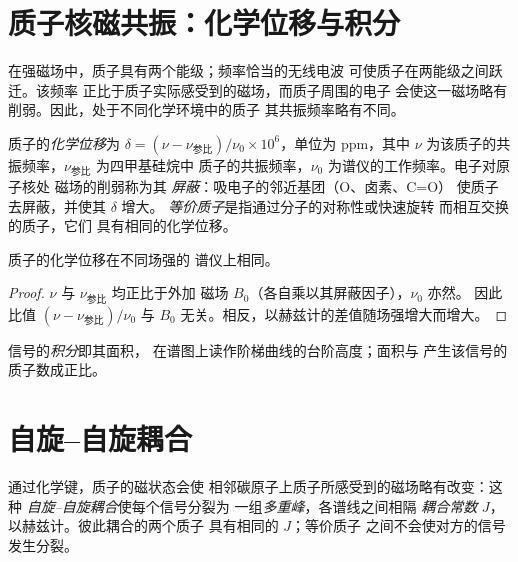 \section{质子核磁共振：化学位移与积分}

在强磁场中，质子具有两个能级；频率恰当的无线电波
可使质子在两能级之间跃迁。该频率
正比于质子实际感受到的磁场，而质子周围的电子
会使这一磁场略有削弱。因此，处于不同化学环境中的质子
其共振频率略有不同。

\begin{definition}\label{def:b1:structure-spectroscopy:chemical-shift}
质子的\emph{化学位移}为
$\delta = (\nu - \nu_{\text{参比}})/\nu_0 \times 10^6$，单位为 \unit{ppm}，其中
$\nu$ 为该质子的共振频率，$\nu_{\text{参比}}$ 为四甲基硅烷中
质子的共振频率，$\nu_0$ 为谱仪的工作频率。电子对原子核处
磁场的削弱称为其
\emph{屏蔽}：吸电子的邻近基团（O、卤素、C=O）
使质子去屏蔽，并使其 $\delta$ 增大。
\emph{等价质子}是指通过分子的对称性或快速旋转
而相互交换的质子，它们
具有相同的化学位移。
\end{definition}

\begin{proposition}[化学位移与谱仪无关]\label{prop:b1:structure-spectroscopy:shift-field-independent}
质子的化学位移在不同场强的
谱仪上相同。
\end{proposition}

\begin{proof}
$\nu$ 与 $\nu_{\text{参比}}$ 均正比于外加
磁场 $B_0$（各自乘以其屏蔽因子），$\nu_0$ 亦然。
因此比值 $(\nu - \nu_{\text{参比}})/\nu_0$ 与
$B_0$ 无关。相反，以赫兹计的差值随场强增大而增大。
\end{proof}

\begin{definition}[积分]\label{def:b1:structure-spectroscopy:integration}
信号的\emph{积分}即其面积，
在谱图上读作阶梯曲线的台阶高度；面积与
产生该信号的质子数成正比。
\end{definition}

\section{自旋–自旋耦合}

\begin{definition}\label{def:b1:structure-spectroscopy:coupling}
通过化学键，质子的磁状态会使
相邻碳原子上质子所感受到的磁场略有改变：这种
\emph{自旋–自旋耦合}使每个信号分裂为
一组\emph{多重峰}，各谱线之间相隔
\emph{耦合常数} $J$，以赫兹计。彼此耦合的两个质子
具有相同的 $J$；等价质子
之间不会使对方的信号发生分裂。
\end{definition}


